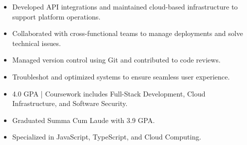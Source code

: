 \par\smallskip
\noindent
\begin{minipage}{20cm}
  \begin{minipage}{9.75cm}
    \begin{itemize}
      \item Developed API integrations and maintained cloud-based infrastructure to support platform operations.
      \item Collaborated with cross-functional teams to manage deployments and solve technical issues.
    \end{itemize}
  \end{minipage}
  \hfill
  \begin{minipage}{9.75cm}
    \begin{itemize}
      \item Managed version control using Git and contributed to code reviews.
      \item Troubleshot and optimized systems to ensure seamless user experience.
    \end{itemize}
  \end{minipage}
\end{minipage}
\par\smallskip
\divider

\begin{itemize}
  \item 4.0 GPA | Coursework includes Full-Stack Development, Cloud Infrastructure, and Software Security.
\end{itemize}
\divider

\begin{itemize}
  \item Graduated Summa Cum Laude with 3.9 GPA.
  \item Specialized in JavaScript, TypeScript, and Cloud Computing.
\end{itemize}

\noindent
\begin{minipage}{20cm}
\end{minipage}



